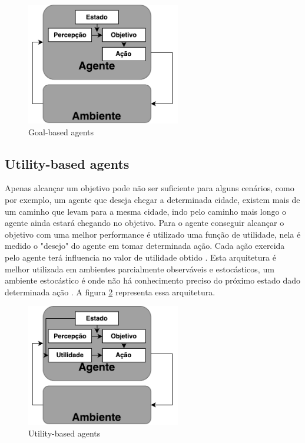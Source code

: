 \begin{figure}[ht]
	\centering
	\includegraphics[width=0.6\textwidth]{fig/agenteGoal.pdf}
	\caption{Goal-based agents}
	\label{fig:agenteGoal}
\end{figure} 

\subsection{Utility-based agents}

Apenas alcançar um objetivo pode não ser suficiente para alguns cenários, como por exemplo, um agente que deseja chegar a determinada cidade, existem mais de um caminho que levam para a mesma cidade, indo pelo caminho mais longo o agente ainda estará chegando no objetivo. Para o agente conseguir alcançar o objetivo com uma melhor performance é utilizado uma função de utilidade, nela é medido o "desejo" do agente em tomar determinada ação. Cada ação exercida pelo agente terá influencia no valor de utilidade obtido \cite{intelligence2003modern}. Esta arquitetura é melhor utilizada em ambientes parcialmente observáveis e estocásticos, um ambiente estocástico é onde não há conhecimento preciso do próximo estado dado determinada ação \cite{intelligence2003modern}. A figura \ref{fig:agenteUtility} representa essa arquitetura.  

\begin{figure}[ht]
	\centering
	\includegraphics[width=0.6\textwidth]{fig/agentUtility.pdf}
	\caption{Utility-based agents}
	\label{fig:agenteUtility}
\end{figure} 


